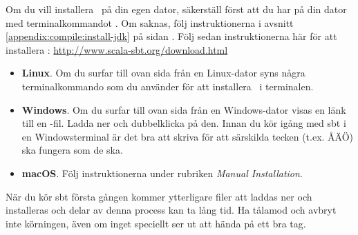 Om du vill installera \sbt\ på din egen dator,
säkerställ först att du har  på din dator med terminalkommandot . Om  saknas, följ instruktionerna i avsnitt \ref{appendix:compile:install-jdk} på sidan \pageref{appendix:compile:install-jdk}.
Följ sedan instruktionerna här för att installera \sbt: \url{http://www.scala-sbt.org/download.html}

\begin{itemize}

\item \textbf{Linux}. Om du surfar till ovan sida från en Linux-dator syns några terminalkommando som du använder för att installera \sbt\ i terminalen.

\item \textbf{Windows}. Om du surfar till ovan sida från en Windows-dator visas en länk till en -fil. Ladda ner och dubbelklicka på den. Innan du kör igång med sbt i en Windowsterminal är det bra att skriva  för att särskilda tecken (t.ex. ÅÄÖ) ska fungera som de ska.

\item \textbf{macOS}. Följ instruktionerna under rubriken \textit{Manual Installation}.

\end{itemize}

\noindent När du kör sbt första gången kommer ytterligare filer att laddas ner och installeras och delar av denna process kan ta lång tid. Ha tålamod och avbryt inte körningen, även om inget speciellt ser ut att hända på ett bra tag.

%
%


